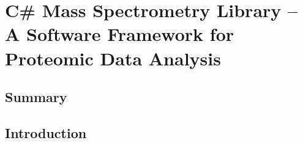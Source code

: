 \chapter{C\# Mass Spectrometry Library -- A Software Framework for Proteomic Data Analysis}

\section{Summary}

\section{Introduction}
